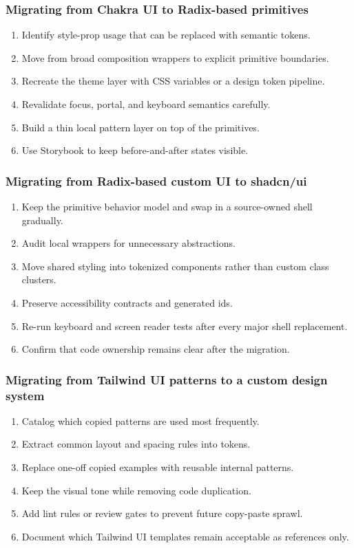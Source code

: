 \subsubsection*{Migrating from Chakra UI to Radix-based primitives}
\begin{enumerate}[leftmargin=*, itemsep=0.35em]
  \item Identify style-prop usage that can be replaced with semantic tokens.
  \item Move from broad composition wrappers to explicit primitive boundaries.
  \item Recreate the theme layer with CSS variables or a design token pipeline.
  \item Revalidate focus, portal, and keyboard semantics carefully.
  \item Build a thin local pattern layer on top of the primitives.
  \item Use Storybook to keep before-and-after states visible.
\end{enumerate}

\subsubsection*{Migrating from Radix-based custom UI to shadcn/ui}
\begin{enumerate}[leftmargin=*, itemsep=0.35em]
  \item Keep the primitive behavior model and swap in a source-owned shell gradually.
  \item Audit local wrappers for unnecessary abstractions.
  \item Move shared styling into tokenized components rather than custom class clusters.
  \item Preserve accessibility contracts and generated ids.
  \item Re-run keyboard and screen reader tests after every major shell replacement.
  \item Confirm that code ownership remains clear after the migration.
\end{enumerate}

\subsubsection*{Migrating from Tailwind UI patterns to a custom design system}
\begin{enumerate}[leftmargin=*, itemsep=0.35em]
  \item Catalog which copied patterns are used most frequently.
  \item Extract common layout and spacing rules into tokens.
  \item Replace one-off copied examples with reusable internal patterns.
  \item Keep the visual tone while removing code duplication.
  \item Add lint rules or review gates to prevent future copy-paste sprawl.
  \item Document which Tailwind UI templates remain acceptable as references only.
\end{enumerate}

